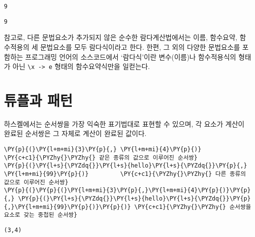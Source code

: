     \begin{Verbatim}[commandchars=\\\{\}]
9
    \end{Verbatim}

    
    
    \begin{Verbatim}[commandchars=\\\{\}]
9
    \end{Verbatim}

    
    \noindent 참고로, 다른 문법요소가 추가되지 않은 순수한 람다계산법에서는
이름, 함수요약, 함수적용의 세 문법요소를 모두 람다식이라고 한다. 한편,
그 외의 다양한 문법요소를 포함하는 프로그래밍 언어의 소스코드에서
`람다식'이란 변수(이름)나 함수적용식의 형태가 아닌
\texttt{\textbackslash{}x\ -\textgreater{}\ e} 형태의 함수요약식만을
일컫는다.

    \hypertarget{uxd29cuxd50cuxacfc-uxd328uxd134}{%
\section{튜플과 패턴}\label{uxd29cuxd50cuxacfc-uxd328uxd134}}

하스켈에서는 순서쌍을 가장 익숙한 표기법대로 표현할 수 있으며, 각 요소가
계산이 완료된 순서쌍은 그 자체로 계산이 완료된 값이다.

    \begin{tcolorbox}[breakable, size=fbox, boxrule=1pt, pad at break*=1mm,colback=cellbackground, colframe=cellborder, top=.75ex]
\begin{Verbatim}[commandchars=\\\{\}]
\PY{p}{(}\PY{l+m+mi}{3}\PY{p}{,} \PY{l+m+mi}{4}\PY{p}{)}                \PY{c+c1}{\PYZhy{}\PYZhy{} 같은 종류의 값으로 이루어진 순서쌍}
\PY{p}{(}\PY{l+s}{\PYZdq{}}\PY{l+s}{hello}\PY{l+s}{\PYZdq{}}\PY{p}{,} \PY{l+m+mi}{99}\PY{p}{)}         \PY{c+c1}{\PYZhy{}\PYZhy{} 다른 종류의 값으로 이루어진 순서쌍}
\PY{p}{(}\PY{p}{(}\PY{l+m+mi}{3}\PY{p}{,}\PY{l+m+mi}{4}\PY{p}{)}\PY{p}{,} \PY{p}{(}\PY{l+s}{\PYZdq{}}\PY{l+s}{hello}\PY{l+s}{\PYZdq{}}\PY{p}{,}\PY{l+m+mi}{99}\PY{p}{)}\PY{p}{)} \PY{c+c1}{\PYZhy{}\PYZhy{} 순서쌍을 요소로 갖는 중첩된 순서쌍}
\end{Verbatim}
\end{tcolorbox}

    
    \begin{Verbatim}[commandchars=\\\{\}]
(3,4)
    \end{Verbatim}

